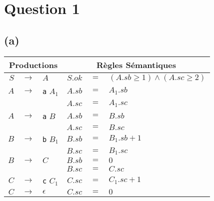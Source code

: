 \documentclass[class=article]{standalone}
\begin{document}
\section*{Question 1}

\subsection*{(a)}

\begin{center}
  \begin{tabular}{|rcl|rcl|}
      \hline
      \multicolumn{3}{|c}{\bf Productions} &
      \multicolumn{3}{|c|}{\bf Règles Sémantiques} \\
      \hline
      \hline
      $S$ & $\rightarrow$ & $A$ & $S.ok$ & $=$ & $(A.sb \geq 1) \wedge (A.sc \geq 2)  $\\
      \hline
      $A$ & $\rightarrow$ & \lstinline[]$a$ $A_1$ & $A.sb$ & $=$ & $A_1.sb$\\
          &               &                       & $A.sc$ & $=$ & $A_1.sc$\\
      \hline      
      $A$ & $\rightarrow$ & \lstinline[]$a$ $B$ & $A.sb$ & $=$ & $B.sb$\\
          &               &                     & $A.sc$ & $=$ & $B.sc$\\
      \hline
      $B$ & $\rightarrow$ & \lstinline[]$b$ $B_1$ & $B.sb$ & $=$ & $B_1.sb + 1$\\
          &               &                       & $B.sc$ & $=$ & $B_1.sc$\\
      \hline
      $B$ & $\rightarrow$ & $C$ & $B.sb$ & $=$ & $0$\\
          &               &     & $B.sc$ & $=$ & $C.sc$\\
      \hline
      $C$ & $\rightarrow$ & \lstinline[]$c$ $C_1$ & $C.sc$ & $=$ & $C_1.sc + 1$\\
      \hline
      $C$ & $\rightarrow$ & $\epsilon$& $C.sc$ & $=$ & $0$\\
      \hline
  \end{tabular}
\end{center}
\end{document}
